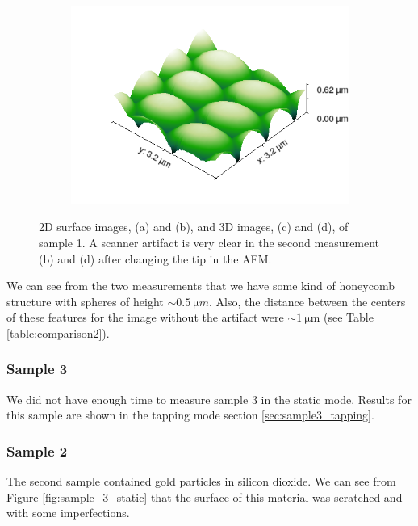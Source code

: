 \documentclass[11pt,a4paper]{article}
\begin{document}
\begin{figure}[H]
\begin{subfigure}[b]{0.45\textwidth}
\caption{}
\label{fig:sample1_first_tip2}
\end{subfigure}
\begin{subfigure}[b]{0.45\textwidth}
\includegraphics[width=\textwidth]{sm_sample1_dir2_3D}
\caption{}
\label{fig:sample1_second_tip2}
\end{subfigure}
\caption{2D surface images, (a) and (b), and 3D images, (c) and (d), of sample 1. A scanner artifact is very clear in the second measurement (b) and (d) after changing the tip in the AFM.}
\label{fig:sample1_static_general}
\end{figure}

We can see from the two measurements that we have some kind of honeycomb structure with spheres of height $\sim\SI{0.5}{\micro m}$. Also, the distance between the centers of these features for the image without the artifact were $\sim\SI{1}{\micro\m}$ (see Table \ref{table:comparison2}).

\newpage
\subsubsection{Sample 3}
We did not have enough time to measure sample 3 in the static mode. Results for this sample are shown in the tapping mode section \ref{sec:sample3_tapping}.

\subsubsection{Sample 2}
The second sample contained gold particles in silicon dioxide. We can see from Figure \ref{fig:sample_3_static} that the surface of this material was scratched and with some imperfections.
\end{document}
